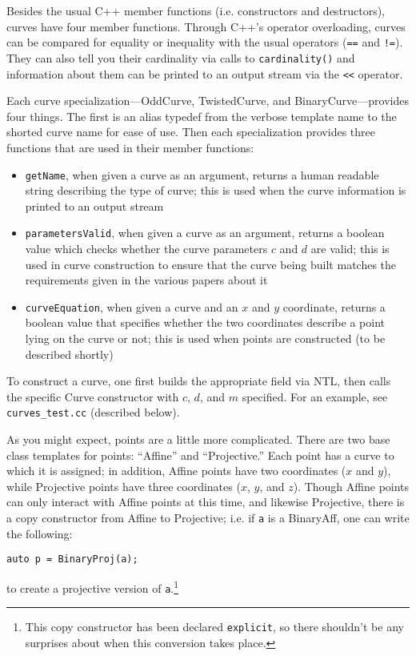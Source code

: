Besides the usual C++ member functions (i.e. constructors and destructors),
    curves have four member functions.
Through C++'s operator overloading, curves can be compared for equality or
    inequality with the usual operators (\texttt{==} and \texttt{!=}).
They can also tell you their cardinality via calls to \texttt{cardinality()}
    and information about them can be printed to an output stream via the
    \texttt{<<} operator.

Each curve specialization---OddCurve, TwistedCurve, and BinaryCurve---provides
    four things.
The first is an alias typedef from the verbose template name to the shorted
    curve name for ease of use.
Then each specialization provides three functions that are used in their member
    functions:
\begin{itemize}
\item   \texttt{getName}, when given a curve as an argument, returns a human
    readable string describing the type of curve; this is used when the curve
    information is printed to an output stream
\item   \texttt{parametersValid}, when given a curve as an argument, returns a
    boolean value which checks whether the curve parameters $c$ and $d$ are
    valid; this is used in curve construction to ensure that the curve being
    built matches the requirements given in the various papers about it
\item   \texttt{curveEquation}, when given a curve and an $x$ and $y$
    coordinate, returns a boolean value that specifies whether the two
    coordinates describe a point lying on the curve or not; this is used when
    points are constructed (to be described shortly)
\end{itemize}

To construct a curve, one first builds the appropriate field via NTL, then
    calls the specific Curve constructor with $c$, $d$, and $m$ specified.
For an example, see \texttt{curves\_test.cc} (described below).


As you might expect, points are a little more complicated.
There are two base class templates for points: ``Affine'' and ``Projective.''
Each point has a curve to which it is assigned; in addition, Affine points have
    two coordinates ($x$ and $y$), while Projective points have three
    coordinates ($x$, $y$, and $z$).
Though Affine points can only interact with Affine points at this time, and
    likewise Projective, there is a copy constructor from Affine to Projective;
    i.e. if \texttt{a} is a BinaryAff, one can write the following:
\begin{lstlisting}
auto p = BinaryProj(a);
\end{lstlisting}
    to create a projective version of \texttt{a}.\footnote{This copy
    constructor has been declared \texttt{explicit}, so there shouldn't be any
    surprises about when this conversion takes place.}

